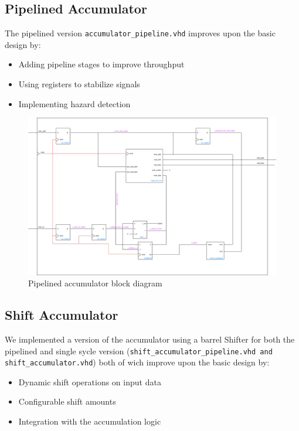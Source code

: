 \documentclass[a4paper,12pt]{article}
\begin{document}
\subsection{Pipelined Accumulator}
The pipelined version \texttt{accumulator\_pipeline.vhd} improves
 upon the basic design by:
\begin{itemize}
    \item Adding pipeline stages to improve throughput
    \item Using registers to stabilize signals
    \item Implementing hazard detection
\end{itemize}

\begin{figure}[H]
    \centering
    \includegraphics[width=1.0\linewidth]{accumulator_pipeline.png}
    \caption{Pipelined accumulator block diagram}
    \label{fig:pipeline}
\end{figure}

\subsection{Shift Accumulator}
We implemented a version of the accumulator using a barrel Shifter for both the pipelined and single sycle version (\texttt{shift\_accumulator\_pipeline.vhd and shift\_accumulator.vhd}) both of wich improve upon the basic design by:
\begin{itemize}
    \item Dynamic shift operations on input data
    \item Configurable shift amounts
    \item Integration with the accumulation logic
\end{itemize}
\end{document}
